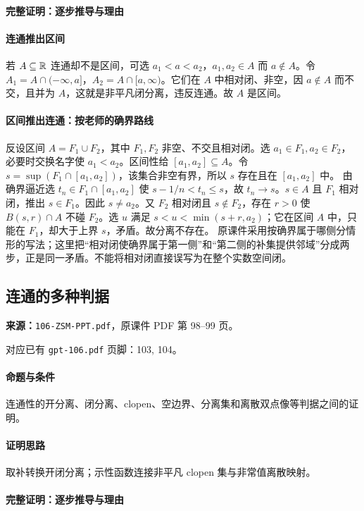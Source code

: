 \paragraph{完整证明：逐步推导与理由}

\paragraph{连通推出区间}
若 $A\subseteq\mathbb{R}$ 连通却不是区间，可选 $a_1<a<a_2$，$a_1,a_2\in A$ 而 $a\notin A$。令 $A_1=A\cap(-\infty,a]$，$A_2=A\cap[a,\infty)$。它们在 $A$ 中相对闭、非空，因 $a\notin A$ 而不交，且并为 $A$，这就是非平凡闭分离，违反连通。故 $A$ 是区间。
\paragraph{区间推出连通：按老师的确界路线}
反设区间 $A=F_1\cup F_2$，其中 $F_1,F_2$ 非空、不交且相对闭。选 $a_1\in F_1,a_2\in F_2$，必要时交换名字使 $a_1<a_2$。区间性给 $[a_1,a_2]\subseteq A$。令 $s=\sup(F_1\cap[a_1,a_2])$，该集合非空有界，所以 $s$ 存在且在 $[a_1,a_2]$ 中。
由确界逼近选 $t_n\in F_1\cap[a_1,a_2]$ 使 $s-1/n<t_n\le s$，故 $t_n\to s$。$s\in A$ 且 $F_1$ 相对闭，推出 $s\in F_1$。因此 $s\ne a_2$。又 $F_2$ 相对闭且 $s\notin F_2$，存在 $r>0$ 使 $B(s,r)\cap A$ 不碰 $F_2$。选 $u$ 满足 $s<u<\min(s+r,a_2)$；它在区间 $A$ 中，只能在 $F_1$，却大于上界 $s$，矛盾。故分离不存在。
原课件采用按确界属于哪侧分情形的写法；这里把“相对闭使确界属于第一侧”和“第二侧的补集提供邻域”分成两步，正是同一矛盾。不能将相对闭直接误写为在整个实数空间闭。

\clearpage\subsection{连通的多种判据}
\textbf{来源：}\texttt{106-ZSM-PPT.pdf}，原课件 PDF 第 98--99 页。\par
对应已有 \texttt{gpt-106.pdf} 页脚：103, 104。\par
\paragraph{命题与条件}连通性的开分离、闭分离、clopen、空边界、分离集和离散双点像等判据之间的证明。
\paragraph{证明思路}取补转换开闭分离；示性函数连接非平凡 clopen 集与非常值离散映射。
\paragraph{完整证明：逐步推导与理由}

